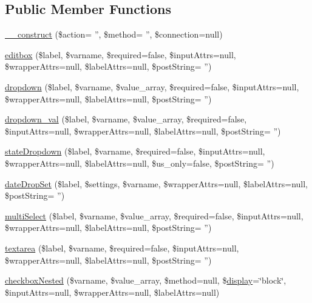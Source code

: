 \subsection*{Public Member Functions}
\begin{DoxyCompactItemize}
\item 
\hyperlink{classg_form_boot_strap_abd4079f66c2a04d81af8e7674b8777e0}{\-\_\-\-\_\-construct} (\$action= '', \$method= '', \$connection=null)
\item 
\hyperlink{classg_form_boot_strap_a1f4232ed79c9b88bc3c5b47b025e7744}{editbox} (\$label, \$varname, \$required=false, \$input\-Attrs=null, \$wrapper\-Attrs=null, \$label\-Attrs=null, \$post\-String= '')
\item 
\hyperlink{classg_form_boot_strap_a6ea9943a48bcd8c586e3fe78b8c71562}{dropdown} (\$label, \$varname, \$value\-\_\-array, \$required=false, \$input\-Attrs=null, \$wrapper\-Attrs=null, \$label\-Attrs=null, \$post\-String= '')
\item 
\hyperlink{classg_form_boot_strap_aeed35dae69403ccf2a93a69b5d7abe61}{dropdown\-\_\-val} (\$label, \$varname, \$value\-\_\-array, \$required=false, \$input\-Attrs=null, \$wrapper\-Attrs=null, \$label\-Attrs=null, \$post\-String= '')
\item 
\hyperlink{classg_form_boot_strap_a726da47f5bccd3146ecf936b90a86f29}{state\-Dropdown} (\$label, \$varname, \$required=false, \$input\-Attrs=null, \$wrapper\-Attrs=null, \$label\-Attrs=null, \$us\-\_\-only=false, \$post\-String= '')
\item 
\hyperlink{classg_form_boot_strap_a9d6a45eabcab3b8a17165663cec6e513}{date\-Drop\-Set} (\$label, \$settings, \$varname, \$wrapper\-Attrs=null, \$label\-Attrs=null, \$post\-String= '')
\item 
\hyperlink{classg_form_boot_strap_ae6cae34e565f7fe86b944bcd8e88db60}{multi\-Select} (\$label, \$varname, \$value\-\_\-array, \$required=false, \$input\-Attrs=null, \$wrapper\-Attrs=null, \$label\-Attrs=null, \$post\-String= '')
\item 
\hyperlink{classg_form_boot_strap_a75f5f558be1b3535a68aa45cc7b22339}{textarea} (\$label, \$varname, \$required=false, \$input\-Attrs=null, \$wrapper\-Attrs=null, \$label\-Attrs=null, \$post\-String= '')
\item 
\hyperlink{classg_form_boot_strap_a83c6bbcee34e89edaf5981a1eda2da2b}{checkbox\-Nested} (\$varname, \$value\-\_\-array, \$method=null, \$\hyperlink{classg_form_a0b9b6e6acd4a839fc7c2f26f96b5cfa8}{display}=\char`\"{}block\char`\"{}, \$input\-Attrs=null, \$wrapper\-Attrs=null, \$label\-Attrs=null)
\end{DoxyCompactItemize}
